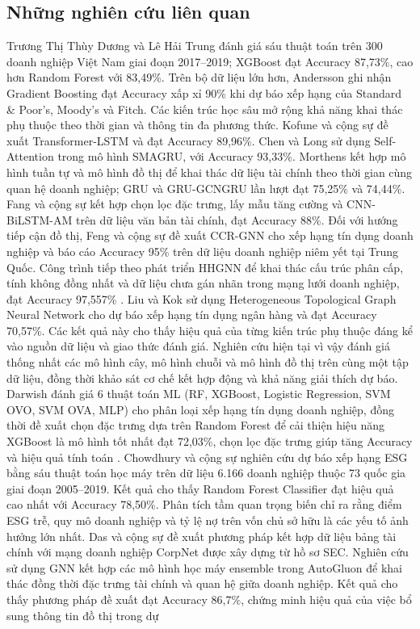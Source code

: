 \documentclass[10pt,twoside]{article}
\begin{document}
\subsection{Những nghiên cứu liên quan}
Trương Thị Thùy Dương và Lê Hải Trung \cite{thuy_ung_2023} đánh giá sáu thuật toán trên 300 doanh nghiệp Việt Nam giai đoạn 2017--2019; XGBoost đạt Accuracy 87,73\%, cao hơn Random Forest với 83,49\%. Trên bộ dữ liệu lớn hơn, Andersson \cite{andersson_machine_2023} ghi nhận Gradient Boosting đạt Accuracy xấp xỉ 90\% khi dự báo xếp hạng của Standard \& Poor's, Moody's và Fitch. Các kiến trúc học sâu mở rộng khả năng khai thác phụ thuộc theo thời gian và thông tin đa phương thức. Kofune và cộng sự \cite{kofune_enhancing_2026} đề xuất Transformer-LSTM và đạt Accuracy 89,96\%. Chen và Long \cite{chen_novel_2020} sử dụng Self-Attention trong mô hình SMAGRU, với Accuracy 93,33\%. Morthens \cite{morthens_1989-_credit_2024} kết hợp mô hình tuần tự và mô hình đồ thị để khai thác dữ liệu tài chính theo thời gian cùng quan hệ doanh nghiệp; GRU và GRU-GCNGRU lần lượt đạt 75,25\% và 74,44\%. Fang và cộng sự \cite{fang_design_2025} kết hợp chọn lọc đặc trưng, lấy mẫu tăng cường và CNN-BiLSTM-AM trên dữ liệu văn bản tài chính, đạt Accuracy 88\%. Đối với hướng tiếp cận đồ thị, Feng và cộng sự \cite{feng_every_2020} đề xuất CCR-GNN cho xếp hạng tín dụng doanh nghiệp và báo cáo Accuracy 95\% trên dữ liệu doanh nghiệp niêm yết tại Trung Quốc. Công trình tiếp theo phát triển HHGNN để khai thác cấu trúc phân cấp, tính không đồng nhất và dữ liệu chưa gán nhãn trong mạng lưới doanh nghiệp, đạt Accuracy 97,557\% \cite{feng_corporate_2024}. Liu và Kok \cite{liu_prediction_2025} sử dụng Heterogeneous Topological Graph Neural Network cho dự báo xếp hạng tín dụng ngân hàng và đạt Accuracy 70,57\%. Các kết quả này cho thấy hiệu quả của từng kiến trúc phụ thuộc đáng kể vào nguồn dữ liệu và giao thức đánh giá. Nghiên cứu hiện tại vì vậy đánh giá thống nhất các mô hình cây, mô hình chuỗi và mô hình đồ thị trên cùng một tập dữ liệu, đồng thời khảo sát cơ chế kết hợp động và khả năng giải thích dự báo. Darwish đánh giá 6 thuật toán ML (RF, XGBoost, Logistic Regression, SVM OVO, SVM OVA, MLP) cho phân loại xếp hạng tín dụng doanh nghiệp, đồng thời đề xuất chọn đặc trưng dựa trên Random Forest để cải thiện hiệu năng XGBoost là mô hình tốt nhất đạt 72,03\%, chọn lọc đặc trưng giúp tăng Accuracy và hiệu quả tính toán \cite{darwish_optimization_2025}. Chowdhury và cộng sự \cite{chowdhury_environmental_2023} nghiên cứu dự báo xếp hạng ESG bằng sáu thuật toán học máy trên dữ liệu 6.166 doanh nghiệp thuộc 73 quốc gia giai đoạn 2005--2019. Kết quả cho thấy Random Forest Classifier đạt hiệu quả cao nhất với Accuracy 78,50\%. Phân tích tầm quan trọng biến chỉ ra rằng điểm ESG trễ, quy mô doanh nghiệp và tỷ lệ nợ trên vốn chủ sở hữu là các yếu tố ảnh hưởng lớn nhất. Das và cộng sự \cite{das_credit_2023} đề xuất phương pháp kết hợp dữ liệu bảng tài chính với mạng doanh nghiệp CorpNet được xây dựng từ hồ sơ SEC. Nghiên cứu sử dụng GNN kết hợp các mô hình học máy ensemble trong AutoGluon để khai thác đồng thời đặc trưng tài chính và quan hệ giữa doanh nghiệp. Kết quả cho thấy phương pháp đề xuất đạt Accuracy 86,7\%, chứng minh hiệu quả của việc bổ sung thông tin đồ thị trong dự 
\end{document}
